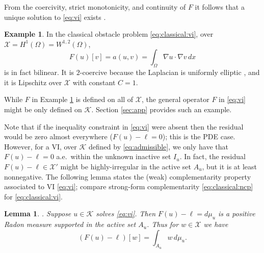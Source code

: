 \documentclass[]{interact}
\theoremstyle{plain}%
\newtheorem{lemma}[theorem]{Lemma}
\theoremstyle{definition}
\newtheorem{example}[theorem]{Example}
\theoremstyle{remark}
\newcommand{\grad}{\nabla}
\newcommand{\cK}{\mathcal{K}}
\newcommand{\cX}{\mathcal{X}}
\begin{document}
From the coercivity, strict monotonicity, and continuity of $F$ it follows that a unique solution to \eqref{eq:vi} exists \cite[Corollary III.1.8]{KinderlehrerStampacchia1980}.

\begin{example}  \label{example:classicalobstacle}
In the classical obstacle problem \eqref{eq:classical:vi}, over $\cX=H^1(\Omega)=W^{1,2}(\Omega)$,
\begin{equation} \label{eq:classical:bilinearform}
F(u)[v] = a(u,v) = \int_\Omega \grad u\cdot \grad v\,dx
\end{equation}
is in fact bilinear.  It is $2$-coercive because the Laplacian is uniformly elliptic \cite{Evans2010}, and it is Lipschitz over $\cX$ with constant $C=1$.
\end{example}

While $F$ in Example \ref{example:classicalobstacle} is defined on all of $\cX$, the general operator $F$ in \eqref{eq:vi} might be only defined on $\cK$.  Section \ref{sec:app} provides such an example.

Note that if the inequality constraint in \eqref{eq:vi} were absent then the residual would be zero almost everywhere ($F(u)-\ell=0$); this is the PDE case.  However, for a VI, over $\cK$ defined by \eqref{eq:admissible}, we only have that $F(u)-\ell=0$ a.e.~within the unknown inactive set $I_u$.  In fact, the residual $F(u)-\ell\in \cX'$ might be highly-irregular in the active set $A_u$, but it is at least nonnegative.  The following lemma states the (weak) complementarity property associated to VI \eqref{eq:vi}; compare strong-form complementarity \eqref{eq:classical:ncp} for \eqref{eq:classical:vi}.

\begin{lemma} \label{lem:measure}\cite[Theorem II.6.9]{KinderlehrerStampacchia1980}.  Suppose $u\in \cK$ solves \eqref{eq:vi}.  Then $F(u)-\ell=d\mu_u$ is a positive Radon measure supported in the active set $A_u$.  Thus for $w\in\cX$ we have
\begin{equation}
(F(u)-\ell)[w] = \int_{A_u} w\, d\mu_u. \label{eq:measure}
\end{equation}
\end{lemma}
\end{document}
